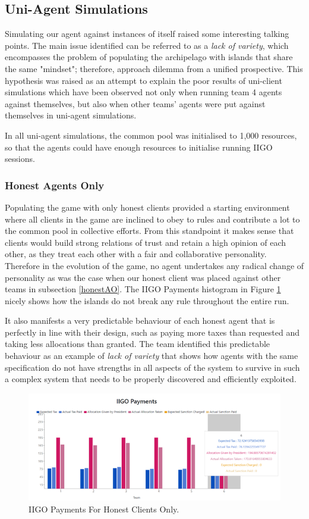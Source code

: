 \subsection{Uni-Agent Simulations} \label{againstself}
Simulating our agent against instances of itself raised some interesting talking points. The main issue identified can be referred to as a \emph{lack of variety}, which encompasses the problem of populating the archipelago with islands that share the same "mindset"; therefore, approach dilemma from a unified prospective. This hypothesis was raised as an attempt to explain the poor results of uni-client simulations which have been observed not only when running team 4 agents against themselves, but also when other teams' agents were put against themselves in uni-agent simulations.

In all uni-agent simulations, the common pool was initialised to 1,000 resources, so that the agents could have enough resources to initialise running IIGO sessions.

\subsubsection{Honest Agents Only}
Populating the game with only honest clients provided a starting environment where all clients in the game are inclined to obey to rules and contribute a lot to the common pool in collective efforts. From this standpoint it makes sense that clients would build strong relations of trust and retain a high opinion of each other, as they treat each other with a fair and collaborative personality. Therefore in the evolution of the game, no agent undertakes any radical change of personality as was the case when our honest client was placed against other teams in subsection \ref{honestAO}. The IIGO Payments histogram in Figure \ref{fig:IIGOHH} nicely shows how the islands do not break any rule throughout the entire run.

It also manifests a very predictable behaviour of each honest agent that is perfectly in line with their design, such as paying more taxes than requested and taking less allocations than granted. The team identified this predictable behaviour as an example of \emph{lack of variety} that shows how agents with the same specification do not have strengths in all aspects of the system to survive in such a complex system that needs to be properly discovered and efficiently exploited.

\begin{figure}[H]
\centering
\includegraphics[scale=0.8]{12_team4_agentdesign/images/IIGOHH.png}
\caption{IIGO Payments For Honest Clients Only.}
\label{fig:IIGOHH}
\end{figure}

